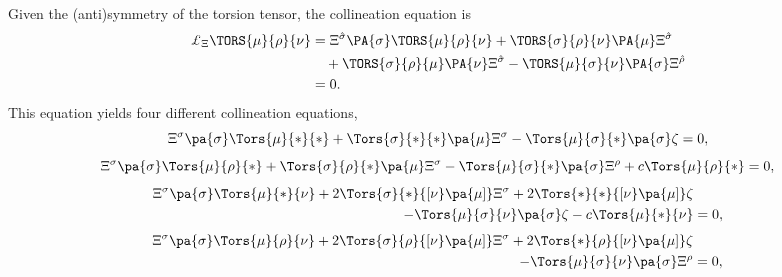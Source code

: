 \documentclass[aps,prd,12pt,superscriptaddress,showpacs,showkeys,reprint]{revtex4-1}
\begin{document}
Given the (anti)symmetry of the torsion tensor, the collineation equation is
\begin{equation}
  \begin{split}
    \pounds_\Xi \TORS{\mu}{\rho}{\nu} &= \Xi^{\hat{\sigma}} \PA{\sigma} \TORS{\mu}{\rho}{\nu} + \TORS{\sigma }{\rho}{\nu} \PA{\mu} \Xi^{\hat{\sigma}} \\
    & \quad + \TORS{\sigma }{\rho}{\mu} \PA{\nu} \Xi^{\hat{\sigma}}- \TORS{\mu}{\sigma}{\nu} \PA{\sigma} \Xi^{\hat{\rho}} \\
    &= 0.
  \end{split}
\end{equation}
This equation yields four different collineation equations,
\begin{equation}
    \Xi^\sigma \pa{\sigma} \Tors{\mu}{*}{*} + \Tors{\sigma}{*}{*} \pa{\mu} \Xi^\sigma - \Tors{\mu}{\sigma}{*} \pa{\sigma} \zeta = 0,
\end{equation}
\begin{equation}
  \Xi^\sigma \pa{\sigma} \Tors{\mu}{\rho}{*} + \Tors{\sigma}{\rho}{*} \pa{\mu} \Xi^\sigma - \Tors{\mu}{\sigma}{*} \pa{\sigma} \Xi^\rho + c \Tors{\mu}{\rho}{*} = 0,
\end{equation}
\begin{equation}
  \begin{split}
    \Xi^\sigma \pa{\sigma} \Tors{\mu}{*}{\nu} + 2 \Tors{\sigma}{*}{[\nu} \pa{\mu]} \Xi^\sigma + 2 \Tors{*}{*}{[\nu} \pa{\mu]} \zeta & \\
    - \Tors{\mu}{\sigma}{\nu} \pa{\sigma} \zeta - c \Tors{\mu}{*}{\nu} &= 0,
  \end{split}
\end{equation}
\begin{equation}
  \begin{split}
    \Xi^\sigma \pa{\sigma} \Tors{\mu}{\rho}{\nu} + 2 \Tors{\sigma}{\rho}{[\nu} \pa{\mu]} \Xi^\sigma + 2 \Tors{*}{\rho}{[\nu} \pa{\mu]} \zeta & \\
    - \Tors{\mu}{\sigma}{\nu} \pa{\sigma} \Xi^\rho &= 0,
  \end{split}  
\end{equation}



\end{document}
